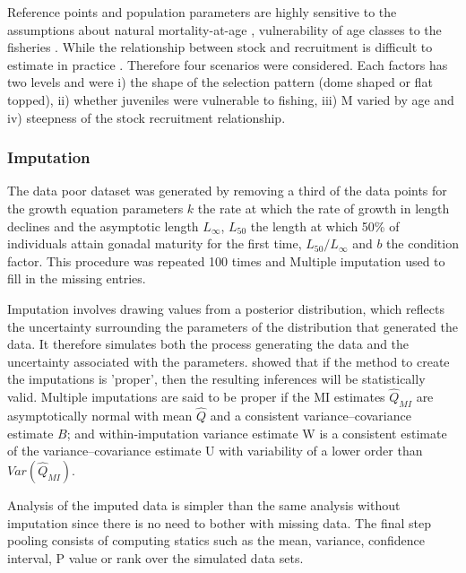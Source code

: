 \documentclass[12pt,doublespacing,a4paper]{ouparticle}
\begin{document}
Reference points and population parameters are highly sensitive to the assumptions about natural mortality-at-age \citep{jiao2012modelling}, vulnerability of age classes to the fisheries \citep{brooks2009analytical}. While the relationship between stock and recruitment is difficult to estimate in practice \citep[e.g.][]{vert2013frequency,szuwalski2014examining,cury2014resolving,kell2015spawning,pepin2015reconsidering}. Therefore four scenarios \citep[][]{ono2015importance,kell2015spawning,boorman1997recognising} were considered. Each factors has two levels and were i) the shape of the selection pattern (dome shaped or flat topped), ii) whether juveniles  were vulnerable to fishing, iii) M varied by age and iv) steepness of the stock recruitment relationship. 

\subsubsection{Imputation}

The data poor dataset was generated by removing a third of the data points for the \cite{vonbert1957quantitative} growth equation parameters  $k$ the rate at which the rate of growth in length declines and the asymptotic length $L_\infty$, $L_{50}$ the length at which 50\% of individuals attain gonadal maturity for the first time, $L_{50}/L_\infty$ and $b$ the condition factor. This procedure was repeated 100 times and Multiple imputation \citep[MI,][]{rubin2004multiple} used to fill in the missing entries.

Imputation involves drawing values from a posterior distribution, which reflects the uncertainty surrounding the parameters of the distribution that generated the data. It therefore simulates both the process generating the data and the uncertainty associated with the parameters. \cite{rubin1987calculation} showed that if the method to create the imputations is 'proper', then the resulting inferences will be statistically valid. Multiple imputations are said to be proper if the MI estimates $\hat{Q}_{MI}$ are asymptotically  normal with mean $\hat{Q}$ and a  consistent variance–covariance estimate $B$; and within-imputation variance estimate W is a consistent estimate of the variance–covariance estimate U with variability of a lower order than $Var(\hat{Q}_{MI})$. 

Analysis of the imputed data is simpler than the same analysis without imputation since there is no need to bother with missing data. The final step pooling consists of computing statics such as the mean, variance, confidence interval, P value or rank over the simulated data sets. 
\end{document}
